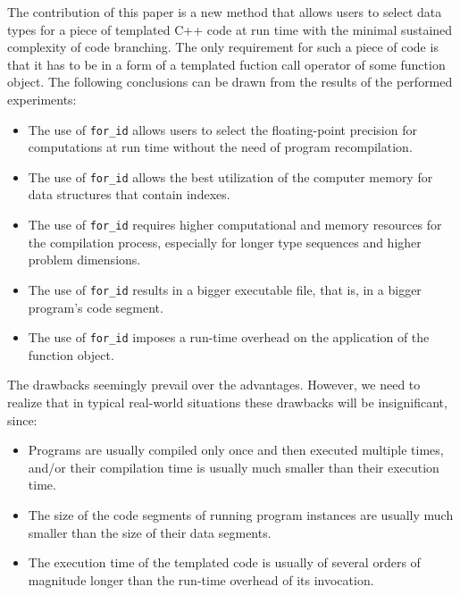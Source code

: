 \documentclass[10pt,a4paper]{article}
\theoremstyle{definition}\newtheorem{problem}{Problem}
\providecommand{\forid}{\texttt{for\_id}\xspace}
\begin{document}
The contribution of this paper is a new method that allows users to select data types for a piece of templated C++ code at run time with the minimal sustained complexity of code branching. The only requirement for such a piece of code is that it has to be in a form of a templated fuction call operator of some function object. The following conclusions can be drawn from the results of the performed experiments:
\begin{itemize}

\item The use of \forid allows users to select the floating-point precision for computations at run time without the need of program recompilation.

\item The use of \forid allows the best utilization of the computer memory for data structures that contain indexes. 
\item The use of \forid requires higher computational and memory resources for the compilation process, especially for longer type sequences and higher problem dimensions. 

\item The use of \forid results in a bigger executable file, that is, in a bigger program's code segment.

\item The use of \forid imposes a run-time overhead on the application of the function object.

\end{itemize}
The drawbacks seemingly prevail over the advantages. However, we need to realize that in typical real-world situations these drawbacks will be insignificant, since:
\begin{itemize}

\item Programs are usually compiled only once and then executed multiple times, and/or their compilation time is usually much smaller than their execution time.

\item The size of the code segments of running program instances are usually much smaller than the size of their data segments.

\item The execution time of the templated code is usually of several orders of magnitude longer than the run-time overhead of its invocation.

\end{itemize}
\end{document}
